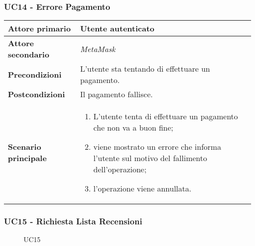 \subsubsection{UC14 - Errore Pagamento}
\label{UC14}
\begin{center}
\renewcommand{\arraystretch}{1.5}
\begin{tabular}{ | m{10em} | m{20em} | }
    \hline
    \textbf{Attore primario} & Utente autenticato \\
    \hline
    \textbf{Attore secondario} & \textit{MetaMask} \\
    \hline
    \textbf{Precondizioni} & L'utente sta tentando di effettuare un pagamento. \\
    \hline
    \textbf{Postcondizioni} & Il pagamento fallisce. \\
    \hline
    \textbf{Scenario principale} & \begin{enumerate}
        \item L'utente tenta di effettuare un pagamento che non va a buon fine;
        \item viene mostrato un errore che informa l'utente sul motivo del fallimento
              dell'operazione;
        \item l'operazione viene annullata.
    \end{enumerate} \\
    \hline
   \end{tabular}
\end{center}

\subsubsection{UC15 - Richiesta Lista Recensioni}
\label{UC15}

\begin{figure}[H]
    \centering
    
    \caption{UC15}
 \end{figure}

